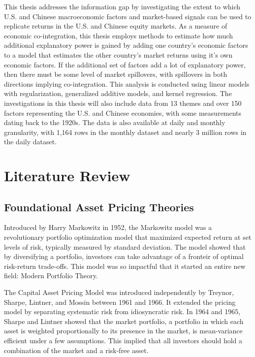 This thesis addresses the information gap by investigating the extent to which U.S. and Chinese macroeconomic factors and market-based signals can be used to replicate returns in the U.S. and Chinese equity markets. As a measure of economic co-integration, this thesis employs methods to estimate how much additional explanatory power is gained by adding one country's economic factors to a model that estimates the other country's market returns using it's own economic factors. If the additional set of factors add a lot of explanatory power, then there must be some level of market spillovers, with spillovers in both directions implying co-integration. This analysis is conducted using linear models with regularization, generalized additive models, and kernel regression. The investigations in this thesis will also include data from 13 themes and over 150 factors representing the U.S. and Chinese economies, with some measurements dating back to the 1920s. The data is also available at daily and monthly granularity, with 1,164 rows in the monthly dataset and nearly 3 million rows in the daily dataset.

\section{Literature Review}

\subsection{Foundational Asset Pricing Theories}

Introduced by Harry Markowitz in 1952, the Markowitz model was a revolutionary portfolio optimization model that maximized expected return at set levels of risk, typically measured by standard deviation.\cite{markowitz} The model showed that by diversifying a portfolio, investors can take advantage of a fronteir of optimal risk-return trade-offs. This model was so impactful that it started an entire new field: Modern Portfolio Theory.

The Capital Asset Pricing Model was introduced independently by Treynor, Sharpe, Lintner, and Mossin between 1961 and 1966.\cite{CAPM} It extended the pricing model by separating systematic risk from idiosyncratic risk. In 1964 and 1965, Sharpe and Lintner showed that the market portfolio, a portfolio in which each asset is weighted proportionally to its presence in the market, is mean-variance efficient under a few assumptions.\cite{CAPM} This implied that all investors should hold a combination of the market and a risk-free asset. 


